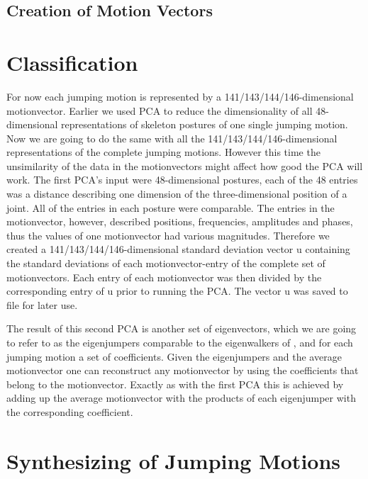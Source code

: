 \documentclass[a4paper]{article}
\begin{document}
\subsection{Creation of Motion Vectors}




\section{Classification}

For now each jumping motion is represented by a 141/143/144/146-dimensional motionvector. Earlier we used PCA to reduce the dimensionality of all 48-dimensional representations of skeleton postures of one single jumping motion. Now we are going to do the same with all the 141/143/144/146-dimensional representations of the complete jumping motions. However this time the unsimilarity of the data in the motionvectors might affect how good the PCA will work. The first PCA's input were 48-dimensional postures, each of the 48 entries was a distance describing one dimension of the three-dimensional position of a joint. All of the entries in each posture were comparable. The entries in the motionvector, however, described positions, frequencies, amplitudes and phases, thus the values of one motionvector had various magnitudes. Therefore we created a 141/143/144/146-dimensional standard deviation vector u containing the standard deviations of each motionvector-entry of the complete set of motionvectors. Each entry of each motionvector was then divided by the corresponding entry of u prior to running the PCA. The vector u was saved to file for later use.

The result of this second PCA is another set of eigenvectors, which we are going to refer to as the eigenjumpers comparable to the eigenwalkers of \cite{origin}, and for each jumping motion a set of coefficients. Given the eigenjumpers and the average motionvector one can reconstruct any motionvector by using the coefficients that belong to the motionvector. Exactly as with the first PCA this is achieved by adding up the average motionvector with the products of each eigenjumper with the corresponding coefficient.

\section{Synthesizing of Jumping Motions}
\end{document}
